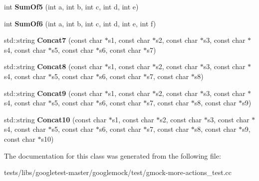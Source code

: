\begin{DoxyCompactItemize}
\item 
\mbox{\label{classtesting_1_1gmock__more__actions__test_1_1Foo_a55fb0cdc224c450f401e0fea4f979512}} 
int {\bfseries Sum\+Of5} (int a, int b, int c, int d, int e)
\item 
\mbox{\label{classtesting_1_1gmock__more__actions__test_1_1Foo_a34b5ae7cd4620331af92c637e3534bc4}} 
int {\bfseries Sum\+Of6} (int a, int b, int c, int d, int e, int f)
\item 
\mbox{\label{classtesting_1_1gmock__more__actions__test_1_1Foo_a5ff9313371e65a91b086afdc2032b0eb}} 
std\+::string {\bfseries Concat7} (const char $\ast$s1, const char $\ast$s2, const char $\ast$s3, const char $\ast$s4, const char $\ast$s5, const char $\ast$s6, const char $\ast$s7)
\item 
\mbox{\label{classtesting_1_1gmock__more__actions__test_1_1Foo_a25b91cea8633d026fe3f4a36c1574b8e}} 
std\+::string {\bfseries Concat8} (const char $\ast$s1, const char $\ast$s2, const char $\ast$s3, const char $\ast$s4, const char $\ast$s5, const char $\ast$s6, const char $\ast$s7, const char $\ast$s8)
\item 
\mbox{\label{classtesting_1_1gmock__more__actions__test_1_1Foo_a8f5b145b0cd23055630b2f9d10b3f45b}} 
std\+::string {\bfseries Concat9} (const char $\ast$s1, const char $\ast$s2, const char $\ast$s3, const char $\ast$s4, const char $\ast$s5, const char $\ast$s6, const char $\ast$s7, const char $\ast$s8, const char $\ast$s9)
\item 
\mbox{\label{classtesting_1_1gmock__more__actions__test_1_1Foo_ad5b1d2dd1bcec98fdc90a05487ec3b14}} 
std\+::string {\bfseries Concat10} (const char $\ast$s1, const char $\ast$s2, const char $\ast$s3, const char $\ast$s4, const char $\ast$s5, const char $\ast$s6, const char $\ast$s7, const char $\ast$s8, const char $\ast$s9, const char $\ast$s10)
\end{DoxyCompactItemize}


The documentation for this class was generated from the following file\+:\begin{DoxyCompactItemize}
\item 
tests/libs/googletest-\/master/googlemock/test/gmock-\/more-\/actions\+\_\+test.\+cc\end{DoxyCompactItemize}
